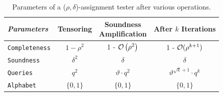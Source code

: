\begin{table}
\centering
\begin{tabular}{|l|c|c|c|}
\hline
{\em Parameters}  &{ Tensoring} & {\parbox{0.9in}{Soundness\\ Amplification}} & \parbox{0.7in}{After $k$\\ Iterations}\\
	\hline
        \hline
        {\tt Completeness} & $1 - \rho^2$ & 1 - ${\cal O}\left(\rho^2\right)$  & 1 - ${\cal O}(\rho^{k + 1})$ \\  
        {\tt Soundness} &   $\delta^2$ & $\delta$&  $\delta$ \\
        {\tt Queries} &   $q^2$ & $\vartheta\cdot q^2$ & $\vartheta^{\sqrt{k}+1} \cdot  q^{k} $ \\
        {\tt Alphabet}&    $\{0,1\}$ & $\{0,1\}$ & $\{0,1\}$ \\
        \hline
\end{tabular} %
  \caption{Parameters of a ($\rho, \delta$)-assignment tester after various operations.} \label{roundup}
\end{table}



